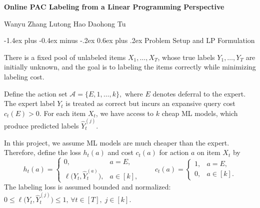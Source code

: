 \documentclass[11pt]{article}
\makeatletter
\renewcommand\section{\@startsection{section}{1}{\z@}%
  {-1.4ex plus -0.4ex minus -.2ex}%
  {0.6ex plus .2ex}%
  {\normalfont\Large\bfseries}}
\renewcommand\subsection{\@startsection{subsection}{2}{\z@}%
  {-1.1ex plus -0.3ex minus -.2ex}%
  {0.45ex plus .15ex}%
  {\normalfont\large\bfseries}}
\newcommand{\calA}{\mathcal{A}}
\newcommand{\hatY}{\widehat Y}
\makeatother
\begin{document}
\vspace*{-0.65in}
\begin{center}
{\Large\bfseries Online PAC Labeling from a Linear Programming Perspective\par}
\vspace{0.35em}
Wanyu Zhang \quad Lutong Hao \quad Daohong Tu
\end{center}
\vspace{-0.6em}


\section{Problem Setup and LP Formulation}
\label{sec:optimization-dual}


There is a fixed pool of unlabeled items $X_1,\ldots,X_T$,
whose true labels $Y_1,\ldots,Y_T$ are initially unknown, and the goal is to labeling the items correctly while minimizing labeling cost.

Define the action set
\(
    \calA = \{E,1,\ldots,k\},
\)
where $E$ denotes deferral to the expert. The expert label $Y_t$ is treated as correct but incurs an 
expansive query cost $c_{t}(E)>0$. For each item $X_t$, we have access to $k$ cheap ML models, which produce predicted labels
\(\hatY_t^{(j)}\). 

In this project, we assume ML models are much cheaper 
than the expert. Therefore, define the loss $h_t(a)$ and 
cost $c_t(a)$ for action $a$ on item $X_t$ by
\begin{equation}
    h_t(a)
    =
    \begin{cases}
        0, & a=E,\\
        \ell\bigl(Y_t,\hatY_t^{(a)}\bigr), & a\in[k],
    \end{cases}
    \qquad
    c_t(a)
    =
    \begin{cases}
        1, & a=E,\\
        0, & a\in[k].
    \end{cases}
    \label{eq:itemwise-loss-cost}
\end{equation}
The labeling loss is assumed bounded and normalized:
\(
    0 \le \ell\bigl(Y_t,\hatY_t^{(j)}\bigr) \le 1,
    \, \forall t\in[T],\; j\in[k].
\)
\end{document}
